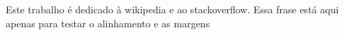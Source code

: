 
\begin{dedicatoria}
  Este trabalho é dedicado à wikipedia e ao stackoverflow. Essa frase está aqui apenas para testar o alinhamento e as margens
\end{dedicatoria}

